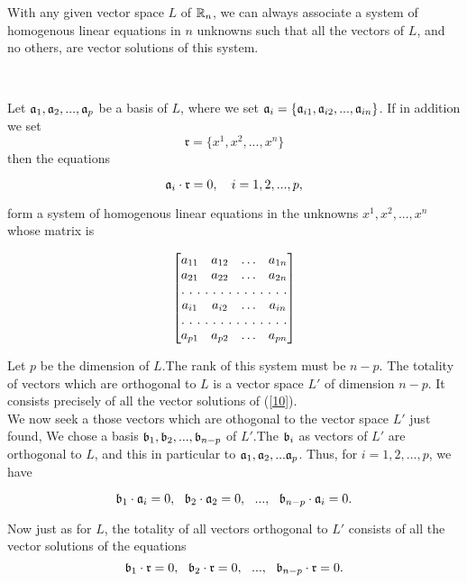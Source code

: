 \begin{theorem}
With any given vector space $L$ of $\mathbb{R}_n$, we can always associate a system of homogenous linear equations in $n$ unknowns such that all the vectors of $L$, and no others, are vector solutions of this system.
\end{theorem}\

Let $\mathfrak{a}_1, \mathfrak{a}_2, ..., \mathfrak{a}_p$ be a basis of $L$, where we set $\mathfrak{a}_i = \{\mathfrak{a}_{i1}, \mathfrak{a}_{i2}, ..., \mathfrak{a}_{in}\}$. If in addition we set 
$$\mathfrak{r} = \{ x^1, x^2, ..., x^n\}$$ then the equations 

\begin{equation}\mathfrak{a}_i \cdot \mathfrak{r} = 0, \quad i = 1, 2, ..., p,\label{10}\end{equation}

form a system of homogenous linear equations in the unknowns $x^1, x^2, ..., x^n$ whose matrix is

\[
\begin{bmatrix}
a_{11} & a_{12}  & \hdots & a_{1n} \\
a_{21} & a_{22}  & \hdots & a_{2n} \\
\hdotsfor[2]{4}\\
a_{i1} & a_{i2}  & \hdots & a_{in}  \\
\hdotsfor[2]{4}\\
a_{p1} & a_{p2}  & \hdots & a_{pn}\\
\end{bmatrix}
\]

Let $p$ be the dimension of $L$.The rank of this system must be $n-p$. The totality of vectors which are orthogonal to $L$ is a vector space $L'$ of dimension $n-p$. It consists precisely of all the vector solutions of (\ref{10}).\\

We now seek a those vectors which are othogonal to the vector space $L'$ just found, We chose a basis $\mathfrak{b}_1, \mathfrak{b}_2, ..., \mathfrak{b}_{n-p}$ of $L'$.The $\mathfrak{b}_i$ as vectors of $L'$ are orthogonal to $L$, and this in particular to 
$\mathfrak{a}_1, \mathfrak{a}_2, ... \mathfrak{a}_p$. Thus, for $i=1, 2, ..., p$, we have

$$\mathfrak{b}_1 \cdot \mathfrak{a}_i = 0, ~~\mathfrak{b}_2 \cdot \mathfrak{a}_2 = 0, ~~..., ~~\mathfrak{b}_{n-p} \cdot \mathfrak{a}_i = 0.$$

Now just as for $L$, the totality of all vectors orthogonal to $L'$ consists of all the vector solutions of the equations
\begin{equation}\mathfrak{b}_1 \cdot \mathfrak{r} = 0, ~~\mathfrak{b}_2 \cdot \mathfrak{r} = 0, ~~..., ~~\mathfrak{b}_{n-p} \cdot \mathfrak{r} = 0.\label{11}\end{equation}
 
